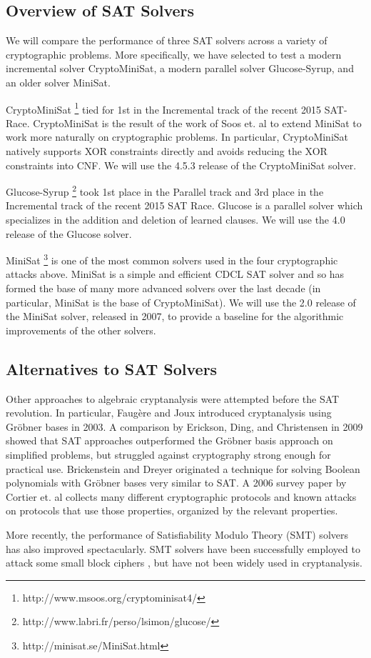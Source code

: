 \subsection{Overview of SAT Solvers}
\label{sec:related:solvers}

We will compare the performance of three SAT solvers across a variety of cryptographic problems. More specifically, we have selected to test a modern incremental solver CryptoMiniSat, a modern parallel solver Glucose-Syrup, and an older solver MiniSat.

CryptoMiniSat \footnote{http://www.msoos.org/cryptominisat4/} tied for 1st in the Incremental track of the recent 2015 SAT-Race. CryptoMiniSat is the result of the work of Soos et. al \cite{SNC09} to extend MiniSat to work more naturally on cryptographic problems.  In particular, CryptoMiniSat natively supports XOR constraints directly and avoids reducing the XOR constraints into CNF. We will use the 4.5.3 release of the CryptoMiniSat solver.

Glucose-Syrup \footnote{http://www.labri.fr/perso/lsimon/glucose/} took 1st place in the Parallel track and 3rd place in the Incremental track of the recent 2015 SAT Race. Glucose is a parallel solver which specializes in the addition and deletion of learned clauses. We will use the 4.0 release of the Glucose solver.

MiniSat \footnote{http://minisat.se/MiniSat.html} is one of the most common solvers used in the four cryptographic attacks above. MiniSat is a simple and efficient CDCL SAT solver and so has formed the base of many more advanced solvers over the last decade (in particular, MiniSat is the base of CryptoMiniSat). We will use the 2.0 release of the MiniSat solver, released in 2007, to provide a baseline for the algorithmic improvements of the other solvers.

\subsection{Alternatives to SAT Solvers}
\label{sec:related:otherattacks}
Other approaches to algebraic cryptanalysis were attempted before the SAT revolution. In particular, Faug\`{e}re and Joux \cite{FJ03} introduced cryptanalysis using Gr\"{o}bner bases in 2003. A comparison by Erickson, Ding, and Christensen \cite{EDC09} in 2009 showed that SAT approaches outperformed the Gr\"{o}bner basis approach on simplified problems, but struggled against cryptography strong enough for practical use. Brickenstein and Dreyer \cite{BD09} originated a technique for solving Boolean polynomials with Gr\"{o}bner bases very similar to SAT. A 2006 survey paper by Cortier et. al \cite{CDL06} collects many different cryptographic protocols and known attacks on protocols that use those properties, organized by the relevant properties.

More recently, the performance of Satisfiability Modulo Theory (SMT) solvers has also improved spectacularly. \cite{BDMOS12} SMT solvers have been successfully employed to attack some small block ciphers \cite{Stanek14}, but have not been widely used in cryptanalysis.